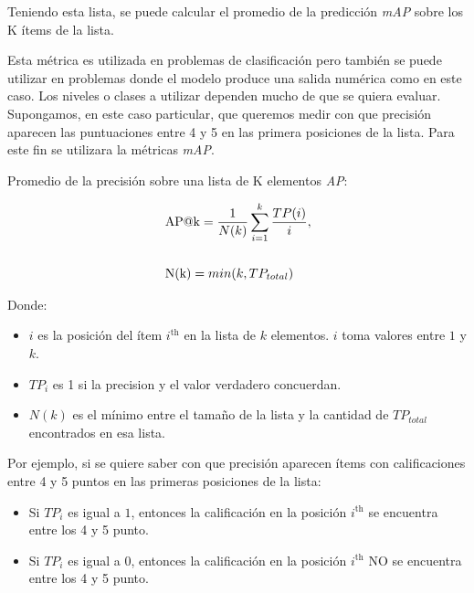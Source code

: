 \documentclass[11pt,a4paper,twoside]{thesis}
\begin{document}
Teniendo esta lista, se puede calcular el promedio de la predicción
\textit{mAP\makeatletter@k} sobre los K ítems de la lista.

Esta métrica es utilizada en problemas de clasificación pero también se puede
utilizar en problemas donde el modelo produce una salida numérica como en este
caso. Los niveles o clases a utilizar dependen mucho de que se quiera evaluar.
Supongamos, en este caso particular, que queremos medir con que precisión
aparecen las puntuaciones entre 4 y 5 en las primera posiciones de la lista.
Para este fin se utilizara la métricas \textit{mAP\makeatletter@k}.

\begin{description}
	\item[Promedio de la precisión sobre una lista de K elementos
	\textit{AP\makeatletter@k}:]
\end{description}
\begin{equation}
	\begin{split}
		& \operatorname{AP\makeatletter@k}=\frac{1}{N(k)} \sum_{i=1}^k \frac{ TP(i)}{i}, \\
		& \\
		& \operatorname{N(k)} = min(k, TP_{total}) \\
	\end{split}
\end{equation}
\begin{description}
	\item[Donde:]
\end{description}
\begin{itemize}
	\item $i$ es la posición del ítem $i^\mathrm{th}$ en la lista de $k$ elementos. $i$  toma valores entre $1$ y $k$.
	\item $TP_i$ es 1 si la precision y el valor verdadero concuerdan.
	\item $N(k)$ es el mínimo entre el tamaño de la lista y la cantidad de $TP_{total}$ encontrados en esa lista.
\end{itemize}

Por ejemplo, si se quiere saber con que precisión aparecen ítems con
calificaciones entre 4 y 5 puntos en las primeras posiciones de la lista:

\begin{itemize}
	\item Si $TP_i$ es igual a $1$, entonces la calificación en la posición
	      $i^\mathrm{th}$ se encuentra entre los 4 y 5 punto.
	\item Si $TP_i$ es igual a $0$, entonces la calificación en la posición
	      $i^\mathrm{th}$ NO se encuentra entre los 4 y 5 punto.
\end{itemize}
\end{document}
